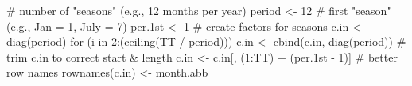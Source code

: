 \begin{Schunk}
\begin{Sinput}
 # number of "seasons" (e.g., 12 months per year)
 period <- 12
 # first "season" (e.g., Jan = 1, July = 7)
 per.1st <- 1
 # create factors for seasons
 c.in <- diag(period)
 for (i in 2:(ceiling(TT / period))) {
   c.in <- cbind(c.in, diag(period))
 }
 # trim c.in to correct start & length
 c.in <- c.in[, (1:TT) + (per.1st - 1)]
 # better row names
 rownames(c.in) <- month.abb
\end{Sinput}
\end{Schunk}
